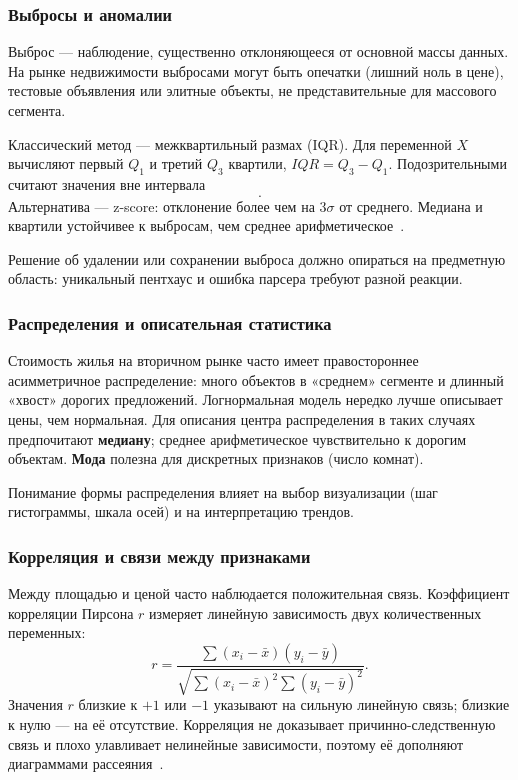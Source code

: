 \subsubsection{Выбросы и аномалии}

Выброс --- наблюдение, существенно отклоняющееся от основной массы данных. На рынке недвижимости выбросами могут быть опечатки (лишний ноль в цене), тестовые объявления или элитные объекты, не представительные для массового сегмента.

Классический метод --- межквартильный размах (IQR). Для переменной $X$ вычисляют первый $Q_1$ и третий $Q_3$ квартили, $IQR = Q_3 - Q_1$. Подозрительными считают значения вне интервала
\begin{equation}
    [Q_1 - 1{,}5 \cdot IQR;\; Q_3 + 1{,}5 \cdot IQR].
    \label{eq:iqr}
\end{equation}
Альтернатива --- z-score: отклонение более чем на $3\sigma$ от среднего. Медиана и квартили устойчивее к выбросам, чем среднее арифметическое~\cite{vanderplas2023,grus2021}.

Решение об удалении или сохранении выброса должно опираться на предметную область: уникальный пентхаус и ошибка парсера требуют разной реакции.

\subsubsection{Распределения и описательная статистика}

Стоимость жилья на вторичном рынке часто имеет правостороннее асимметричное распределение: много объектов в «среднем» сегменте и длинный «хвост» дорогих предложений. Логнормальная модель нередко лучше описывает цены, чем нормальная. Для описания центра распределения в таких случаях предпочитают \textbf{медиану}; среднее арифметическое чувствительно к дорогим объектам. \textbf{Мода} полезна для дискретных признаков (число комнат).

Понимание формы распределения влияет на выбор визуализации (шаг гистограммы, шкала осей) и на интерпретацию трендов.

\subsubsection{Корреляция и связи между признаками}

Между площадью и ценой часто наблюдается положительная связь. Коэффициент корреляции Пирсона $r$ измеряет линейную зависимость двух количественных переменных:
\begin{equation}
    r = \frac{\sum (x_i - \bar{x})(y_i - \bar{y})}{\sqrt{\sum (x_i - \bar{x})^2 \sum (y_i - \bar{y})^2}}.
    \label{eq:pearson}
\end{equation}
Значения $r$ близкие к $+1$ или $-1$ указывают на сильную линейную связь; близкие к нулю --- на её отсутствие. Корреляция не доказывает причинно-следственную связь и плохо улавливает нелинейные зависимости, поэтому её дополняют диаграммами рассеяния~\cite{monarch2022}.


